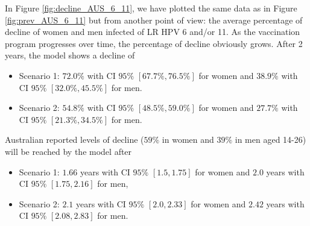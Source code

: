 In Figure \ref{fig:decline_AUS_6_11}, we have plotted the same data as in Figure \ref{fig:prev_AUS_6_11} but from another point of view: the average percentage of decline of women and men infected of LR HPV 6 and/or 11. As the vaccination program progresses over time, the percentage of decline obviously grows. After 2 years, the model shows a decline of

\begin{itemize}
	\item Scenario 1: $72.0\%$ with CI $95\%$ $[67.7\%, 76.5\%]$ for women and $38.9\%$ with CI $95\%$ $[32.0\%, 45.5\%]$ for men. 
	\item Scenario 2: $54.8\%$ with CI $95\%$ $[48.5\%, 59.0\%]$ for women and $27.7\%$ with CI $95\%$ $[21.3\%, 34.5\%]$ for men. 
\end{itemize}

Australian reported levels of decline ($59\%$ in women and $39\%$ in men aged 14-26) will be reached by the model after

\begin{itemize}
	\item Scenario 1: $1.66$ years with CI $95\%$ $[1.5, 1.75]$ for women and $2.0$ years with CI $95\%$ $[1.75, 2.16]$ for men,
	\item Scenario 2: $2.1$ years with CI $95\%$ $[2.0, 2.33]$ for women and $2.42$ years with CI $95\%$ $[2.08, 2.83]$ for men.
\end{itemize}

